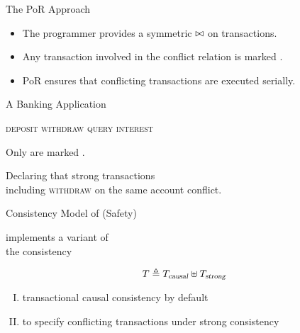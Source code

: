 \begin{frame}{The PoR Approach}

  \begin{itemize}
    \setlength{\itemsep}{8pt}
    \item The programmer provides a symmetric  $\bowtie$
          on transactions.
    \item Any transaction involved in the conflict relation is marked
          .
    \item PoR ensures that conflicting transactions are executed serially.
  \end{itemize}
\end{frame}

\begin{frame}{A Banking Application}
  \begin{center}
    \textsc{deposit \quad withdraw \quad query \quad interest}

    \vspace{0.50cm}
    Only  are marked .

    Declaring that strong transactions \\[3pt]
    including \textsc{withdraw} on the same account conflict.
  \end{center}
\end{frame}

\begin{frame}{Consistency Model of \unistore{} (Safety)}
  \begin{center}
    \unistore{} implements a  variant of \\
    the \por{} consistency

    \pause
    \[
      T \triangleq T_{\textsl{causal}} \uplus T_{\textsl{strong}}
    \]

    \pause
    \vspace{0.60cm}
    \begin{enumerate}[(I)]
      \centering
      \item transactional causal consistency by default
      \item to specify conflicting transactions under strong consistency
    \end{enumerate}
  \end{center}
\end{frame}

